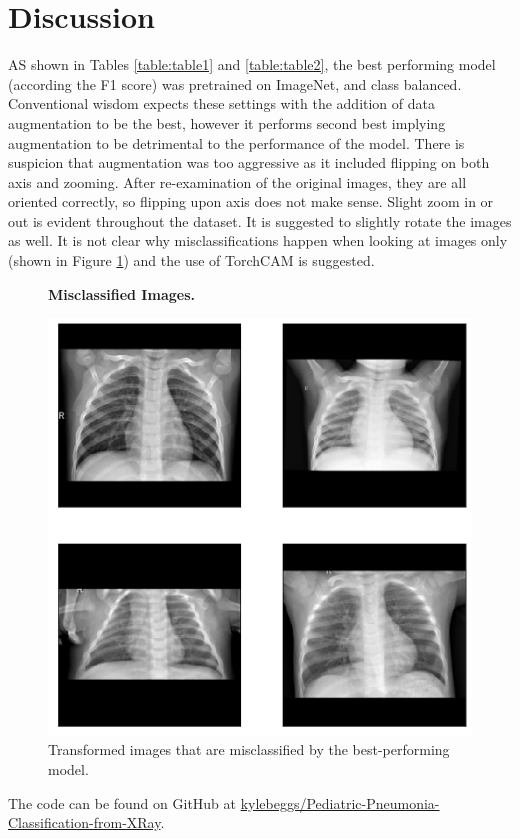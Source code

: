 \documentclass[10pt,twocolumn,letterpaper]{article}
\begin{document}
\section{Discussion}

AS shown in Tables \ref{table:table1} and \ref{table:table2}, the best performing model (according the F1 score) was pretrained on ImageNet, and class balanced. Conventional wisdom expects these settings with the addition of data augmentation to be the best, however it performs second best implying augmentation to be detrimental to the performance of the model. There is suspicion that augmentation was too aggressive as it included flipping on both axis and zooming. After re-examination of the original images, they are all oriented correctly, so flipping upon axis does not make sense. Slight zoom in or out is evident throughout the dataset. It is suggested to slightly rotate the images as well. It is not clear why misclassifications happen when looking at images only (shown in Figure \ref{fig:fig6}) and the use of TorchCAM is suggested.

\begin{figure}[h]
   \begin{center}
      \textbf{Misclassified Images.}\par\medskip
      \includegraphics[width=0.95\linewidth]{images/misclassfied.png}
   \end{center}
   \caption{Transformed images that are misclassified by the best-performing model.}
\label{fig:fig6}
\end{figure}

The code can be found on GitHub at \href{https://github.com/kylebeggs/Pediatric-Pneumonia-Classification-from-XRay}{kylebeggs/Pediatric-Pneumonia-Classification-from-XRay}.
\end{document}
